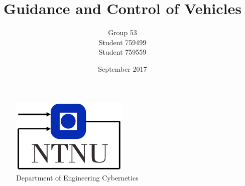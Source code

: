 \documentclass[11pt,a4paper,english]{article}
\title{Guidance and Control of Vehicles}
\author{Group 53 \\ Student 759499 \\Student 759559}
\date{September 2017}
\begin{document}
\listoftodos 

\begin{titlepage}
    \maketitle
    
    \begin{figure}
    \centering
    \includegraphics[width=0.5\textwidth]{figures/itk_ntnu}\\
    Department of Engineering Cybernetics
    \end{figure}
    \thispagestyle{empty}
\end{titlepage}



\thispagestyle{empty} %

\newpage
\tableofcontents
\thispagestyle{empty} %

\newpage
\setcounter{page}{1}
\setcounter{subsection}{2}

\newpage


%
%

\newpage
{}
\printbibliography
\label{sec:bibliography}
\end{document}
